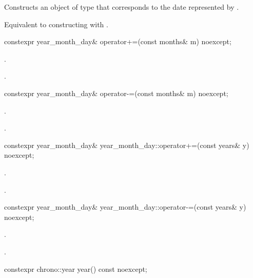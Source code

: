 \begin{itemdescr}
\pnum
\effects
Constructs an object of type 
that corresponds to the date represented by .

\pnum
\remarks
Equivalent to constructing with .
\end{itemdescr}

%
\begin{itemdecl}
constexpr year_month_day& operator+=(const months& m) noexcept;
\end{itemdecl}

\begin{itemdescr}
\pnum
\effects
{}.

\pnum
\returns
{}.
\end{itemdescr}

%
\begin{itemdecl}
constexpr year_month_day& operator-=(const months& m) noexcept;
\end{itemdecl}

\begin{itemdescr}
\pnum
\effects
{}.

\pnum
\returns
{}.
\end{itemdescr}

%
\begin{itemdecl}
constexpr year_month_day& year_month_day::operator+=(const years& y) noexcept;
\end{itemdecl}

\begin{itemdescr}
\pnum
\effects
{}.

\pnum
\returns
{}.
\end{itemdescr}

%
\begin{itemdecl}
constexpr year_month_day& year_month_day::operator-=(const years& y) noexcept;
\end{itemdecl}

\begin{itemdescr}
\pnum
\effects
{}.

\pnum
\returns
{}.
\end{itemdescr}

%
\begin{itemdecl}
constexpr chrono::year year() const noexcept;
\end{itemdecl}

